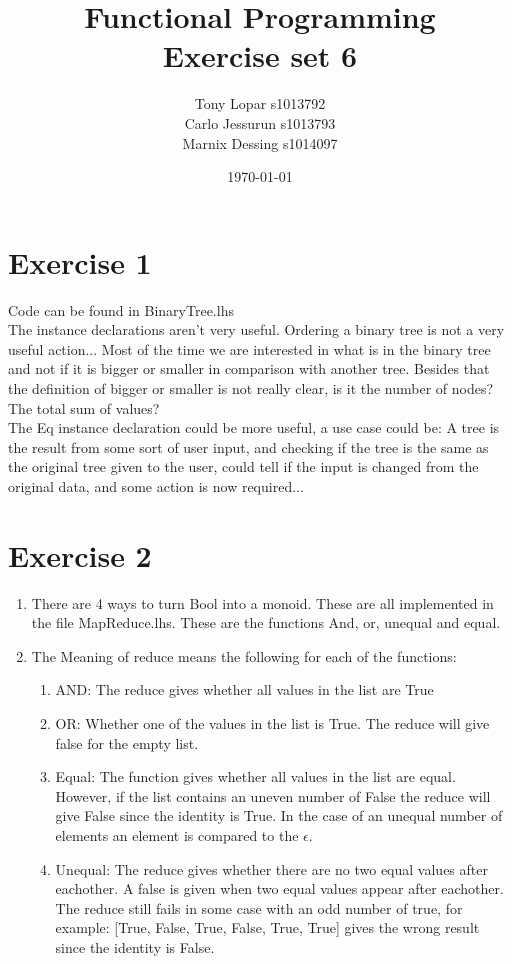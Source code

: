 \documentclass{article}
\begin{document}
\title{Functional Programming \\ Exercise set 6}
\date{\today}
\author{Tony Lopar s1013792 \\ Carlo Jessurun s1013793 \\ Marnix Dessing s1014097}
\maketitle

\section*{Exercise 1}
Code can be found in BinaryTree.lhs\\
The instance declarations aren't very useful. Ordering a binary tree is not a very useful action... Most of the time we are interested in what is in the binary tree and not if it is bigger or smaller in comparison with another tree. Besides that the definition of bigger or smaller is not really clear, is it the number of nodes? The total sum of values?\\
The Eq instance declaration could be more useful, a use case could be: A tree is the result from some sort of user input, and checking if the tree is the same as the original tree given to the user, could tell if the input is changed from the original data, and some action is now required...

\section*{Exercise 2}
\begin{enumerate}
  \item There are 4 ways to turn Bool into a monoid. These are all implemented in the file MapReduce.lhs. These are the functions And, or, unequal and equal.
  \item The Meaning of reduce means the following for each of the functions:
  \begin{enumerate}[label=\roman*)]
  \item AND: The reduce gives whether all values in the list are True
  \item OR: Whether one of the values in the list is True. The reduce will give false for the empty list.
  \item Equal: The function gives whether all values in the list are equal. However, if the list contains an uneven number of False the reduce will give False since the identity is True. In the case of an unequal number of elements an element is compared to the $\epsilon$.
  \item Unequal: The reduce gives whether there are no two equal values after eachother. A false is given when two equal values appear after eachother. The reduce still fails in some case with an odd number of true, for example: [True, False, True, False, True, True] gives the wrong result since the identity is False.
  \end{enumerate}
\end{enumerate}
\end{document}
